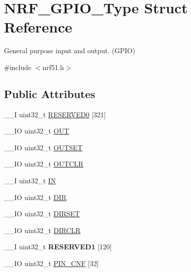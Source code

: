 \hypertarget{struct_n_r_f___g_p_i_o___type}{}\section{N\+R\+F\+\_\+\+G\+P\+I\+O\+\_\+\+Type Struct Reference}
\label{struct_n_r_f___g_p_i_o___type}


General purpose input and output. (G\+P\+I\+O)  




{\ttfamily \#include $<$nrf51.\+h$>$}

\subsection*{Public Attributes}
\begin{DoxyCompactItemize}
\item 
\+\_\+\+\_\+\+I uint32\+\_\+t \hyperlink{struct_n_r_f___g_p_i_o___type_a8c5c2e391ae90c37969c01a40960363e}{R\+E\+S\+E\+R\+V\+E\+D0} \mbox{[}321\mbox{]}
\item 
\+\_\+\+\_\+\+I\+O uint32\+\_\+t \hyperlink{struct_n_r_f___g_p_i_o___type_ada9740773bf5d63334dc0e6495cdc9b2}{O\+U\+T}
\item 
\+\_\+\+\_\+\+I\+O uint32\+\_\+t \hyperlink{struct_n_r_f___g_p_i_o___type_ac776ebd70570b16d0c32b95871311cb9}{O\+U\+T\+S\+E\+T}
\item 
\+\_\+\+\_\+\+I\+O uint32\+\_\+t \hyperlink{struct_n_r_f___g_p_i_o___type_a210ce7b78494fba1974e015d162f2198}{O\+U\+T\+C\+L\+R}
\item 
\+\_\+\+\_\+\+I uint32\+\_\+t \hyperlink{struct_n_r_f___g_p_i_o___type_a28949911de9b33cc747782d604cb7d95}{I\+N}
\item 
\+\_\+\+\_\+\+I\+O uint32\+\_\+t \hyperlink{struct_n_r_f___g_p_i_o___type_a764e29ee686c3f5d869b115a6a54830f}{D\+I\+R}
\item 
\+\_\+\+\_\+\+I\+O uint32\+\_\+t \hyperlink{struct_n_r_f___g_p_i_o___type_ad081475a143678bc52e62834f758ea56}{D\+I\+R\+S\+E\+T}
\item 
\+\_\+\+\_\+\+I\+O uint32\+\_\+t \hyperlink{struct_n_r_f___g_p_i_o___type_ad112d0855e109acaa63d6a3f1622f1d8}{D\+I\+R\+C\+L\+R}
\item 
\hypertarget{struct_n_r_f___g_p_i_o___type_a26b7b007f4ebdc18db34ae809d4aaa13}{}\+\_\+\+\_\+\+I uint32\+\_\+t {\bfseries R\+E\+S\+E\+R\+V\+E\+D1} \mbox{[}120\mbox{]}\label{struct_n_r_f___g_p_i_o___type_a26b7b007f4ebdc18db34ae809d4aaa13}

\item 
\+\_\+\+\_\+\+I\+O uint32\+\_\+t \hyperlink{struct_n_r_f___g_p_i_o___type_adf74f3058a3a9dfcb2bd856a16ee70f7}{P\+I\+N\+\_\+\+C\+N\+F} \mbox{[}32\mbox{]}
\end{DoxyCompactItemize}


